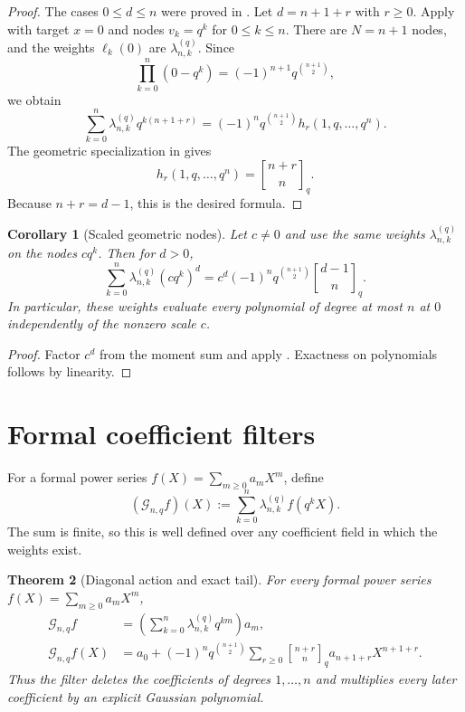 \documentclass[11pt,oneside,openany]{book}
\newtheorem{theorem}{Theorem}[chapter]
\newtheorem{corollary}[theorem]{Corollary}
\theoremstyle{definition}
\theoremstyle{remark}
\newcommand{\Qbinom}[3]{\genfrac{[}{]}{0pt}{}{#1}{#2}_{#3}}
\begin{document}
\begin{proof}
The cases $0\le d\le n$ were proved in .  Let $d=n+1+r$ with $r\ge0$.  Apply  with target $x=0$ and nodes
$v_k=q^k$ for $0\le k\le n$.  There are $N=n+1$ nodes, and the weights $\ell_k(0)$ are $\lambda_{n,k}^{(q)}$.  Since
\[
 \prod_{k=0}^{n}(0-q^k)=(-1)^{n+1}q^{\binom{n+1}{2}},
\]
we obtain
\[
 \sum_{k=0}^{n}\lambda_{n,k}^{(q)}q^{k(n+1+r)}
 =(-1)^nq^{\binom{n+1}{2}}h_r(1,q,\ldots,q^n).
\]
The geometric specialization in  gives
\[
 h_r(1,q,\ldots,q^n)=\Qbinom{n+r}{n}{q}.
\]
Because $n+r=d-1$, this is the desired formula.
\end{proof}

\begin{corollary}[Scaled geometric nodes]\label{cor:scaled-geometric-moments}
Let $c\ne0$ and use the same weights $\lambda_{n,k}^{(q)}$ on the nodes $cq^k$.  Then for $d>0$,
\[
 \sum_{k=0}^{n}\lambda_{n,k}^{(q)}(cq^k)^d
 =c^d(-1)^nq^{\binom{n+1}{2}}\Qbinom{d-1}{n}{q}.
\]
In particular, these weights evaluate every polynomial of degree at most $n$ at $0$ independently of the nonzero scale $c$.
\end{corollary}

\begin{proof}
Factor $c^d$ from the moment sum and apply .  Exactness on polynomials follows by linearity.
\end{proof}

\section{Formal coefficient filters}

For a formal power series $f(X)=\sum_{m\ge0}a_mX^m$, define
\begin{equation}\label{eq:geometric-filter-definition}
 (\mathcal G_{n,q}f)(X)
 :=\sum_{k=0}^{n}\lambda_{n,k}^{(q)}f(q^kX).
\end{equation}
The sum is finite, so this is well defined over any coefficient field in which the weights exist.

\begin{theorem}[Diagonal action and exact tail]\label{thm:geometric-filter-diagonal}
For every formal power series $f(X)=\sum_{m\ge0}a_mX^m$,
\begin{align}
 [X^m]\mathcal G_{n,q}f
 &=\left(\sum_{k=0}^{n}\lambda_{n,k}^{(q)}q^{km}\right)a_m,
 \label{eq:filter-diagonal}\\
 \mathcal G_{n,q}f(X)
 &=a_0+(-1)^nq^{\binom{n+1}{2}}
   \sum_{r\ge0}\Qbinom{n+r}{n}{q}a_{n+1+r}X^{n+1+r}.
 \label{eq:filter-exact-tail}
\end{align}
Thus the filter deletes the coefficients of degrees $1,\ldots,n$ and multiplies every later coefficient by an explicit Gaussian polynomial.
\end{theorem}
\end{document}
